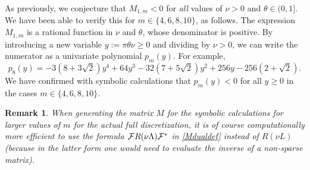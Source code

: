 \documentclass[a4paper]{article}
\newtheorem{remark}{Remark}
\newcommand{\cF}{{\cal{F}}}
\begin{document}
\begin{description}[style=unboxed,leftmargin=0cm]
%
%

As previously, we conjecture that $M_{1,m}<0$ for \emph{all} values of $\nu>0$ and $\theta\in(0,1]$.
We have been able to verify this for $m\in\{4,6,8,10\}$, as follows.
The expression $M_{1,m}$ is a rational function in $\nu$ and $\theta$, whose
denominator is positive. By introducing a new variable $y:=\pi\theta\nu\ge 0$
and dividing by $\nu>0$, we can write the numerator as a univariate polynomial 
$p_m(y)$.  For example,
$$p_8(y) = -3 \left(8+3 \sqrt{2}\right) y^4+64 y^3-32 \left(7+5 \sqrt{2}\right) y^2+256 y-256 \left(2+\sqrt{2}\right).$$
We have confirmed with symbolic calculations that $p_m(y)<0$
for all $y\ge 0$ in the cases $m\in\{4,6,8,10\}$. 
\begin{remark} 
When generating the matrix $M$ for the symbolic calculations for larger values of $m$ for the actual full discretization, it is of course computationally more efficient to use the formula $\cF R(\nu \Lambda) \cF^*$ in \eqref{Mdualdef} instead of $R(\nu L)$ (because in the latter form one would need to evaluate the inverse of a non-sparse matrix).
\end{remark} 


\end{description}
\end{document}
